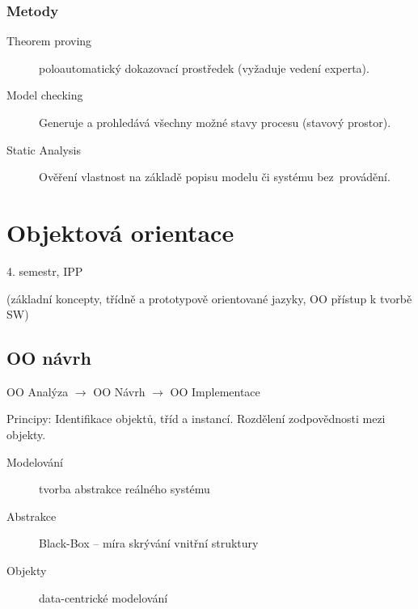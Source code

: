 \documentclass[a4wide]{report}
\begin{document}
\subsection{Metody}
\begin{description}
	\item[Theorem proving] poloautomatický dokazovací prostředek (vyžaduje vedení experta).
	\item[Model checking] Generuje a prohledává všechny možné stavy procesu (stavový prostor).
	\item[Static Analysis] Ověření vlastnost na základě popisu modelu či systému bez~provádění.
\end{description}





































\setcounter{chapter}{35}
\chapter{Objektová orientace} \label{cha:36}

4. semestr, IPP

(základní koncepty, třídně a prototypově orientované jazyky, OO přístup k tvorbě SW)

\section{OO návrh}

OO Analýza $ \to $ OO Návrh $ \to $ OO Implementace

Principy: Identifikace objektů, tříd a instancí. Rozdělení zodpovědnosti mezi objekty.

\begin{description}
	\item[Modelování] tvorba abstrakce reálného systému
	\item[Abstrakce] Black-Box -- míra skrývání vnitřní struktury
	\item[Objekty] data-centrické modelování
\end{description}
\end{document}
